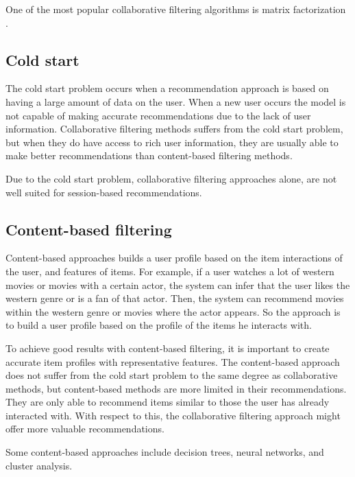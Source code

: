 One of the most popular collaborative filtering algorithms is matrix factorization \cite{matrix-factorization}.

\subsection{Cold start}
The cold start problem occurs when a recommendation approach is based on having a large amount of data on the user. When a new user occurs the model is not capable of making accurate recommendations due to the lack of user information. Collaborative filtering methods suffers from the cold start problem, but when they do have access to rich user information, they are usually able to make better recommendations than content-based filtering methods.

Due to the cold start problem, collaborative filtering approaches alone, are not well suited for session-based recommendations.

\subsection{Content-based filtering}
Content-based approaches builds a user profile based on the item interactions of the user, and features of items. For example, if a user watches a lot of western movies or movies with a certain actor, the system can infer that the user likes the western genre or is a fan of that actor. Then, the system can recommend movies within the western genre or movies where the actor appears. So the approach is to build a user profile based on the profile of the items he interacts with.

To achieve good results with content-based filtering, it is important to create accurate item profiles with representative features. The content-based approach does not suffer from the cold start problem to the same degree as collaborative methods, but content-based methods are more limited in their recommendations. They are only able to recommend items similar to those the user has already interacted with. With respect to this, the collaborative filtering approach might offer more valuable recommendations.

Some content-based approaches include decision trees, neural networks, and cluster analysis.


